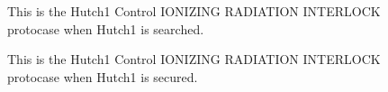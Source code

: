 \documentclass[letterpaper,10pt,english]{sphinxmanual}
\begin{document}
\begin{figure}[htbp]
\centering
\capstart

\noindent{}
\caption{ This is the Hutch\sphinxhyphen{}1 Control IONIZING RADIATION INTERLOCK protocase when Hutch\sphinxhyphen{}1 is searched.}\label{\detokenize{testing_documentation/Hutch-1_ionizing_radiation:id2}}\end{figure}

\begin{figure}[htbp]
\centering
\capstart

\noindent{}
\caption{ This is the Hutch\sphinxhyphen{}1 Control IONIZING RADIATION INTERLOCK protocase when Hutch\sphinxhyphen{}1 is secured.}\label{\detokenize{testing_documentation/Hutch-1_ionizing_radiation:id3}}\end{figure}
\end{document}

